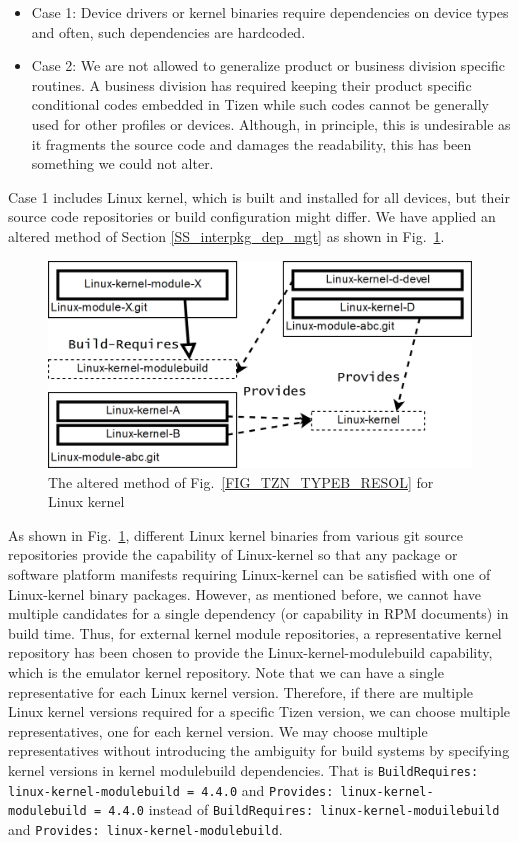 \begin{itemize}
\item Case 1: Device drivers or kernel binaries require dependencies on device types and often, such dependencies are hardcoded.
\item Case 2: We are not allowed to generalize product or business division specific routines. A business division has required keeping their product specific conditional codes embedded in Tizen while such codes cannot be generally used for other profiles or devices. Although, in principle, this is undesirable as it fragments the source code and damages the readability, this has been something we could not alter.
\end{itemize}

Case 1 includes Linux kernel, which is built and installed for all devices, but their source code repositories or build configuration might differ.
We have applied an altered method of Section \ref{SS_interpkg_dep_mgt} as shown in Fig.~\ref{FIG_TZN_KERNELDEP}.


\begin{figure}
\centering
\includegraphics[width=0.95\columnwidth]{figures/KernelDeps_v2.png}
\caption{The altered method of Fig.~\ref{FIG_TZN_TYPEB_RESOL} for Linux kernel}
\label{FIG_TZN_KERNELDEP}
\end{figure}

As shown in Fig.~\ref{FIG_TZN_KERNELDEP}, different Linux kernel binaries from various git source repositories provide the capability of Linux-kernel so that any package or software platform manifests requiring Linux-kernel can be satisfied with one of Linux-kernel binary packages.
However, as mentioned before, we cannot have multiple candidates for a single dependency (or capability in RPM documents) in build time.
Thus, for external kernel module repositories, a representative kernel repository has been chosen to provide the Linux-kernel-modulebuild capability, which is the emulator kernel repository.
Note that we can have a single representative for each Linux kernel version.
Therefore, if there are multiple Linux kernel versions required for a specific Tizen version, we can choose multiple representatives, one for each kernel version.
We may choose multiple representatives without introducing the ambiguity for build systems by specifying kernel versions in kernel modulebuild dependencies.
That is \texttt{BuildRequires: linux-kernel-modulebuild = 4.4.0} and \texttt{Provides: linux-kernel-modulebuild = 4.4.0}  instead of \texttt{BuildRequires: linux-kernel-moduilebuild} and \texttt{Provides: linux-kernel-modulebuild}.


